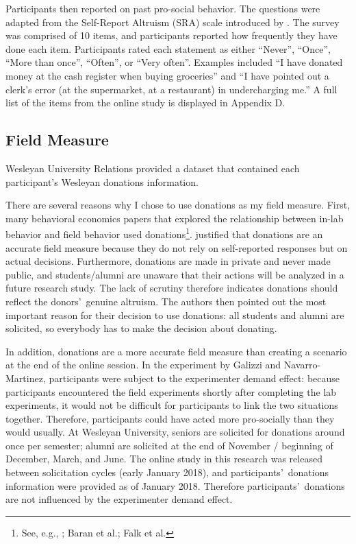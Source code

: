 \documentclass[12pt]{article}
\begin{document}
Participants then reported on past pro-social behavior. The questions were adapted from the Self-Report Altruism (SRA) scale introduced by \cite{rushton_chrisjohn_fekken_1981}. The survey was comprised of 10 items, and participants reported how frequently they have done each item. Participants rated each statement as either ``Never'', ``Once'', ``More than once'', ``Often'', or ``Very often''. Examples included ``I have donated money at the cash register when buying groceries'' and ``I have pointed out a clerk\rq s error (at the supermarket, at a restaurant) in undercharging me.'' A full list of the items from the online study is displayed in Appendix D. 

\subsection{Field Measure}

Wesleyan University Relations provided a dataset that contained each participant\rq s Wesleyan donations information.

There are several reasons why I chose to use donations as my field measure. First, many behavioral economics papers that explored the relationship between in-lab behavior and field behavior used donations\footnote{See, e.g., \cite{benz_meier_2006}; Baran et al.; Falk et al.}. \cite{falk_2013} justified that donations are an accurate field measure because they do not rely on self-reported responses but on actual decisions. Furthermore, donations are made in private and never made public, and students/alumni are unaware that their actions will be analyzed in a future research study. The lack of scrutiny therefore indicates donations should reflect the donors\rq \ genuine altruism. The authors then pointed out the most important reason for their decision to use donations: all students and alumni are solicited, so everybody has to make the decision about donating.

In addition, donations are a more accurate field measure than creating a scenario at the end of the online session. In the experiment by Galizzi and Navarro-Martinez, participants were subject to the experimenter demand effect: because participants encountered the field experiments shortly after completing the lab experiments, it would not be difficult for participants to link the two situations together. Therefore, participants could have acted more pro-socially than they would usually. At Wesleyan University, seniors are solicited for donations around once per semester; alumni are solicited at the end of November / beginning of December, March, and June. The online study in this research was released between solicitation cycles (early January 2018), and participants\rq \ donations information were provided as of January 2018. Therefore participants\rq \ donations are not influenced by the experimenter demand effect.
\end{document}

